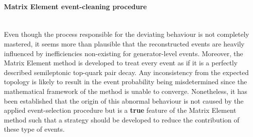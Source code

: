 
\paragraph{Matrix Element event-cleaning procedure} \hfill \\


Even though the process responsible for the deviating behaviour is not completely mastered, it seems more than plausible that the reconstructed events are heavily influenced by inefficiencies non-existing for generator-level events. Moreover, the Matrix Element method is developed to treat every event as if it is a perfectly described semileptonic top-quark pair decay. Any inconsistency from the expected topology is likely to result in the event probability being misdetermined since the mathematical framework of the method is unable to converge.
Nonetheless, it has been established that the origin of this abnormal behaviour is not caused by the applied event-selection procedure but is a \textbf{true} feature of the Matrix Element method such that a strategy should be developed to reduce the contribution of these type of events.
\\

